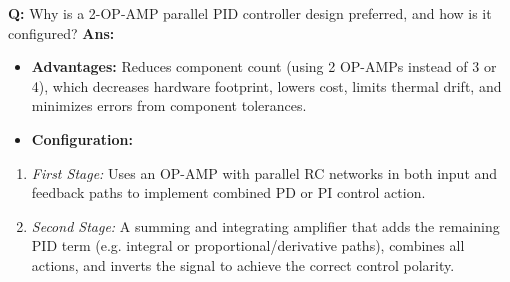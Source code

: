 \documentclass[10pt,a4paper,twocolumn]{article}
\begin{document}
\begin{tcolorbox}[
  colback=white,
  colframe=UnitColorTwo,
  colbacktitle=gray!10!white,
  coltitle=black,
  fonttitle=\bfseries\sffamily\small,
  title={Unit II $\bullet$ Card 14: 2-OP-AMP PID Controller Design (Q2.6)},
  boxrule=1.2pt,
  arc=2mm,
  outer arc=2mm,
  boxsep=1.5mm,
  top=1mm,
  bottom=1mm,
  left=1.5mm,
  right=1.5mm,
  before skip=2.5mm,
  after skip=2.5mm
]
\textbf{Q:} Why is a 2-OP-AMP parallel PID controller design preferred, and how is it configured?
\tcbline
\textbf{Ans:} \begin{itemize}
  \item   \textbf{Advantages:} Reduces component count (using 2 OP-AMPs instead of 3 or 4), which decreases hardware footprint, lowers cost, limits thermal drift, and minimizes errors from component tolerances.
  \item   \textbf{Configuration:}
\end{itemize}
\begin{enumerate}
  \item \textit{First Stage:} Uses an OP-AMP with parallel RC networks in both input and feedback paths to implement combined PD or PI control action.
  \item \textit{Second Stage:} A summing and integrating amplifier that adds the remaining PID term (e.g. integral or proportional/derivative paths), combines all actions, and inverts the signal to achieve the correct control polarity.
\end{enumerate}
\end{tcolorbox}
\end{document}
